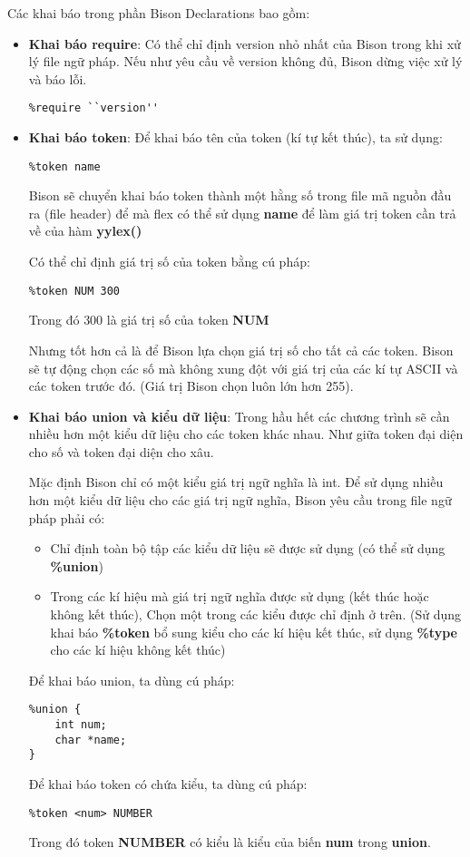 \documentclass[../report.tex]{subfiles}
\begin{document}
Các khai báo trong phần Bison Declarations bao gồm: 
\begin{itemize}
\item \textbf{Khai báo require}:
Có thể chỉ định version nhỏ nhất của Bison trong khi xử lý 
file ngữ pháp. Nếu như yêu cầu về version không đủ, 
Bison dừng việc xử lý và báo lỗi. 
\begin{lstlisting}
%require ``version''
\end{lstlisting}

\item \textbf{Khai báo token}:
Để khai báo tên của token (kí tự kết thúc), ta sử dụng:
\cite{token-declarations}
\begin{lstlisting}
%token name
\end{lstlisting}
Bison sẽ chuyển khai báo token thành một hằng số trong file 
mã nguồn đầu ra (file header) để mà flex có thể sử dụng \textbf{name} để làm giá trị token cần trả về của hàm \textbf{yylex()}

Có thể chỉ định giá trị số của token bằng cú pháp: 
\begin{lstlisting}
%token NUM 300
\end{lstlisting}
Trong đó $300$ là giá trị số của token \textbf{NUM}

Nhưng tốt hơn cả là để Bison lựa chọn giá trị số cho tất cả các 
token. Bison sẽ tự động chọn các số mà không xung đột với giá trị của
các kí tự ASCII và các token trước đó. 
(Giá trị Bison chọn luôn lớn hơn 255). 

\item \textbf{Khai báo union và kiểu dữ liệu}:
Trong hầu hết các chương trình sẽ cần nhiều hơn một kiểu dữ liệu 
cho các token khác nhau. 
\cite{more-than-one} 
Như giữa token đại diện cho số và token đại diện cho xâu. 

Mặc định Bison chỉ có một kiểu giá trị ngữ nghĩa là int. 
Để sử dụng nhiều hơn một kiểu dữ liệu cho các giá trị ngữ
nghĩa, Bison yêu cầu trong file ngữ pháp phải có: 
\begin{itemize}
\item Chỉ định toàn bộ tập các kiểu dữ liệu sẽ được sử dụng (có thể
        sử dụng \textbf{\%union})
\item Trong các kí hiệu mà giá trị ngữ nghĩa được sử dụng 
    (kết thúc hoặc không kết thúc), 
    Chọn một trong các kiểu được chỉ định ở trên.
    (Sử dụng khai báo \textbf{\%token} 
        bổ sung kiểu cho các kí hiệu kết thúc,
    sử dụng \textbf{\%type} cho các kí hiệu không kết thúc)
\end{itemize}
Để khai báo union, ta dùng cú pháp: 
\begin{lstlisting}
%union {
    int num;
    char *name;
}
\end{lstlisting}
Để khai báo token có chứa kiểu, ta dùng cú pháp: 
\begin{lstlisting}
%token <num> NUMBER
\end{lstlisting}
Trong đó token \textbf{NUMBER} có kiểu là kiểu của 
biến \textbf{num} trong \textbf{union}.


\end{itemize}
\end{document}

